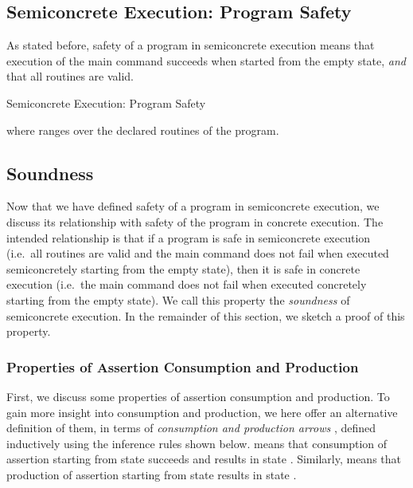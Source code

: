 \documentclass{CSML}
\theoremstyle{definition}\newtheorem{notation}[thm]{Notation}
\theoremstyle{plain}\newtheorem{satz}[thm]{Satz}
\begin{document}
\subsection{Semiconcrete Execution: Program Safety}

As stated before, safety of a program in semiconcrete execution 
means that execution of the main command succeeds when started 
from the empty state, \emph{and} that all routines are valid. 

\begin{defi}{Semiconcrete Execution: Program Safety}

where  ranges over the declared routines of the program.
\end{defi}

\subsection{Soundness}

Now that we have defined safety of a program in semiconcrete 
execution, we discuss its relationship with safety of the 
program in concrete execution. The intended relationship is that if a program is safe in 
semiconcrete execution (i.e.~all routines are valid and the 
main command does not fail when executed semiconcretely 
starting from the empty state), then it is safe in concrete 
execution (i.e.~the main command does not fail when executed 
concretely starting from the empty state). We call this 
property the \emph{soundness} of semiconcrete execution. In the 
remainder of this section, we sketch a proof of this property.

\subsubsection{Properties of Assertion Consumption and Production}

First, we discuss some properties of assertion consumption and 
production. To gain more insight into consumption and production, we here 
offer an alternative definition of them, in terms of 
\emph{consumption and production arrows} ,
defined inductively using the inference rules shown below.
 means that consumption of assertion  starting from state  succeeds and results in state .
Similarly,  means that production of assertion  starting from state  results in
state .
\end{document}
